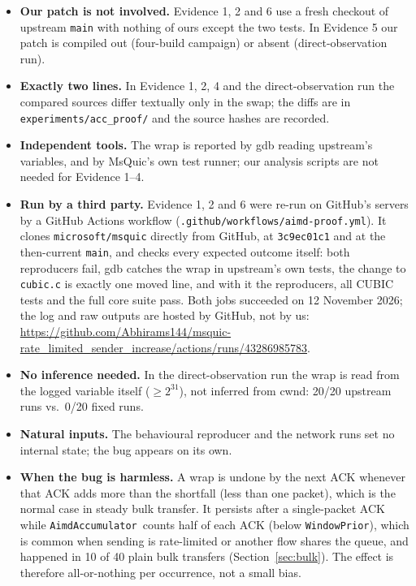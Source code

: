 \documentclass[11pt,a4paper]{article}
\newcommand{\acc}{\texttt{AimdAccumulator}}
\begin{document}
\begin{itemize}
  \item \textbf{Our patch is not involved.} Evidence 1, 2 and 6 use a fresh
        checkout of upstream \texttt{main} with nothing of ours except the two
        tests. In Evidence 5 our patch is compiled out (four-build campaign)
        or absent (direct-observation run).
  \item \textbf{Exactly two lines.} In Evidence 1, 2, 4 and the
        direct-observation run the compared sources differ textually only in
        the swap; the diffs are in \texttt{experiments/acc\_proof/} and the
        source hashes are recorded.
  \item \textbf{Independent tools.} The wrap is reported by gdb reading
        upstream's variables, and by MsQuic's own test runner; our analysis
        scripts are not needed for Evidence 1--4.
  \item \textbf{Run by a third party.} Evidence 1, 2 and 6 were re-run on
        GitHub's servers by a GitHub Actions workflow
        (\texttt{.github/workflows/aimd-proof.yml}). It clones
        \texttt{microsoft/msquic} directly from GitHub, at \texttt{3c9ec01c1}
        and at the then-current \texttt{main}, and checks every expected
        outcome itself: both reproducers fail, gdb catches the wrap in
        upstream's own tests, the change to \texttt{cubic.c} is exactly one
        moved line, and with it the reproducers, all CUBIC tests and the full
        core suite pass. Both jobs succeeded on 12 November 2026; the log and
        raw outputs are hosted by GitHub, not by us:
        \url{https://github.com/Abhirams144/msquic-rate_limited_sender_increase/actions/runs/43286985783}.
  \item \textbf{No inference needed.} In the direct-observation run the wrap
        is read from the logged variable itself ($\ge 2^{31}$), not inferred
        from cwnd: 20/20 upstream runs vs.\ 0/20 fixed runs.
  \item \textbf{Natural inputs.} The behavioural reproducer and the network
        runs set no internal state; the bug appears on its own.
  \item \textbf{When the bug is harmless.} A wrap is undone by the next ACK
        whenever that ACK adds more than the shortfall (less than one
        packet), which is the normal case in steady bulk transfer. It
        persists after a single-packet ACK while \acc\ counts half of each
        ACK (below \texttt{WindowPrior}), which is common when sending is
        rate-limited or another flow shares the queue, and happened in
        10 of 40 plain bulk transfers (Section~\ref{sec:bulk}). The effect
        is therefore all-or-nothing per occurrence, not a small bias.
\end{itemize}
\end{document}

